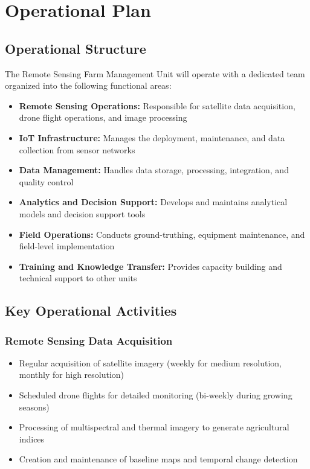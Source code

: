 \section{Operational Plan}

\subsection{Operational Structure}
The Remote Sensing Farm Management Unit will operate with a dedicated team organized into the following functional areas:

\begin{itemize}
    \item \textbf{Remote Sensing Operations:} Responsible for satellite data acquisition, drone flight operations, and image processing
    
    \item \textbf{IoT Infrastructure:} Manages the deployment, maintenance, and data collection from sensor networks
    
    \item \textbf{Data Management:} Handles data storage, processing, integration, and quality control
    
    \item \textbf{Analytics and Decision Support:} Develops and maintains analytical models and decision support tools
    
    \item \textbf{Field Operations:} Conducts ground-truthing, equipment maintenance, and field-level implementation
    
    \item \textbf{Training and Knowledge Transfer:} Provides capacity building and technical support to other units
\end{itemize}

\subsection{Key Operational Activities}

\subsubsection{Remote Sensing Data Acquisition}
\begin{itemize}
    \item Regular acquisition of satellite imagery (weekly for medium resolution, monthly for high resolution)
    \item Scheduled drone flights for detailed monitoring (bi-weekly during growing seasons)
    \item Processing of multispectral and thermal imagery to generate agricultural indices
    \item Creation and maintenance of baseline maps and temporal change detection
\end{itemize}

